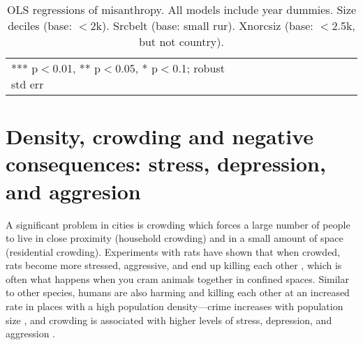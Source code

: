 \documentclass[10pt, letterpaper]{article}
\begin{document}
\begin{spacing}{1.4}
 \begin{spacing}{.8}
   \begin{table}[H]\centering
     \caption{OLS regressions  of misanthropy. All models include year
       dummies. Size deciles (base: $<$2k). Srcbelt (base: small rur). Xnorcsiz (base: $<$2.5k, but not country).} \label{regE}
     \begin{scriptsize} \begin{tabular}{p{1.2in}p{.45in}p{.45in}p{.45in}p{.45in}p{.45in}p{.45in}p{.45in}p{.45in}p{.45in}p{.45 in}}\hline
         
         \hline  *** p$<$0.01, ** p$<$0.05, * p$<$0.1; robust std err
       \end{tabular}\end{scriptsize}\end{table}
 \end{spacing}

\section{Density, crowding and negative consequences: stress, depression, and aggresion}
 
A significant problem in cities is crowding which forces a large number of
people to live in close proximity (household crowding) and in a small amount of
space (residential crowding). Experiments with rats have shown that when
crowded, rats become more stressed, aggressive, and end up killing each other
\citep{calhoun62}, which is often what happens when you cram animals together in
confined spaces. Similar to other species, humans are also harming and killing each other at an increased rate in places with a high population density---crime increases with population size
 \citep{bettencourt10b}, and crowding is associated with higher levels of
 stress, depression, and aggression \citep{regoeczi2008}. 


\end{spacing}
\end{document}
